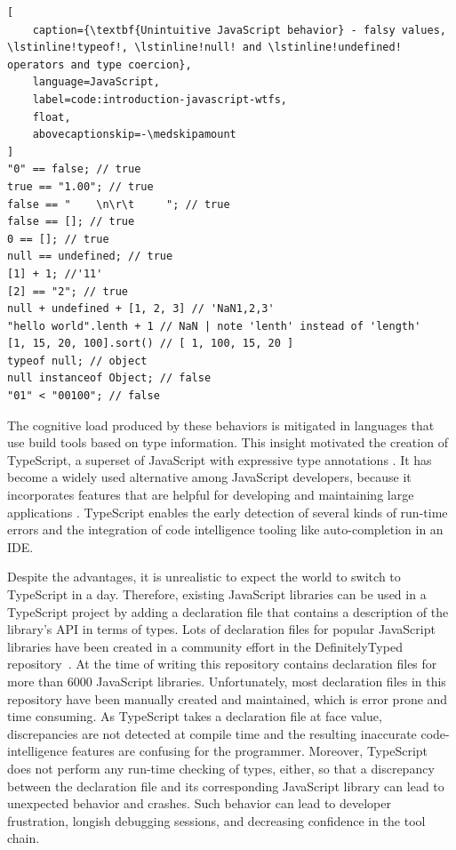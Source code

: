 \documentclass[english,cleveref,autoref,submission]{programming}
\begin{document}
\begin{lstlisting}[
    caption={\textbf{Unintuitive JavaScript behavior} - falsy values, \lstinline!typeof!, \lstinline!null! and \lstinline!undefined! operators and type coercion},
    language=JavaScript,
	label=code:introduction-javascript-wtfs,
    float,
    abovecaptionskip=-\medskipamount
]
"0" == false; // true
true == "1.00"; // true
false == "    \n\r\t     "; // true
false == []; // true
0 == []; // true
null == undefined; // true
[1] + 1; //'11'
[2] == "2"; // true
null + undefined + [1, 2, 3] // 'NaN1,2,3'
"hello world".lenth + 1 // NaN | note 'lenth' instead of 'length'
[1, 15, 20, 100].sort() // [ 1, 100, 15, 20 ]
typeof null; // object
null instanceof Object; // false
"01" < "00100"; // false
\end{lstlisting}

The cognitive load produced by these behaviors is mitigated in languages that use
build tools based on type information. This insight motivated the
creation of TypeScript, a superset of JavaScript with expressive type
annotations \cite{typescript}. It has become a widely used alternative
among JavaScript developers, because it incorporates features that are
helpful for developing and maintaining large applications
\cite{DBLP:conf/icse/GaoBB17}. TypeScript enables the early detection
of several kinds of run-time errors and the integration of code intelligence
tooling like auto-completion in an IDE.

Despite the advantages, it is unrealistic to expect the world to
switch to TypeScript in a day. Therefore, 
existing JavaScript libraries can be used in a TypeScript project by
adding a declaration file that contains a description of the library's
API in terms of types. Lots of declaration files for popular
JavaScript libraries have been created in a community effort in the
DefinitelyTyped repository~\cite{definitely-typed-repository}.
At the time of writing this repository contains declaration files for
more than 6000 JavaScript libraries. Unfortunately, most declaration
files in this repository have been manually created and maintained,
which is error prone and time consuming. As TypeScript takes a
declaration file at face value, discrepancies are not detected at
compile time and the resulting inaccurate code-intelligence features
are confusing for the
programmer. Moreover, TypeScript does not perform any run-time 
checking of types, either, so that a discrepancy  between the declaration file
and its corresponding JavaScript library can lead to unexpected 
behavior and crashes. Such behavior can lead to developer
frustration, longish debugging sessions, and decreasing confidence in
the tool chain.
\end{document}
